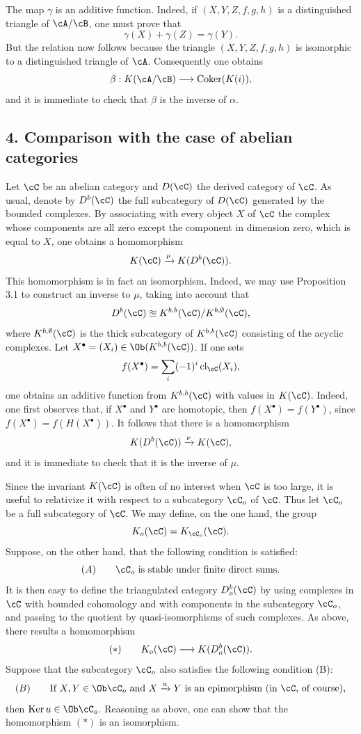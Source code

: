 The map $\gamma$ is an additive function. Indeed, if $(X,Y,Z,f,g,h)$ is a distinguished triangle of $\cA/\cB$, one must prove that
\[
\gamma(X)+\gamma(Z)=\gamma(Y).
\]
But the relation now follows because the triangle $(X,Y,Z,f,g,h)$ is isomorphic to a distinguished triangle of $\cA$. Consequently one obtains
\[
\beta:K(\cA/\cB)\longrightarrow \operatorname{Coker}(K(i)),
\]
and it is immediate to check that $\beta$ is the inverse of $\alpha$.

\subsection*{4. Comparison with the case of abelian categories}

Let $\cC$ be an abelian category and $D(\cC)$ the derived category of $\cC$. As usual, denote by $D^b(\cC)$ the full subcategory of $D(\cC)$ generated by the bounded complexes. By associating with every object $X$ of $\cC$ the complex whose components are all zero except the component in dimension zero, which is equal to $X$, one obtains a homomorphism
\[
K(\cC)\xrightarrow{\mu}K(D^b(\cC)).
\]
This homomorphism is in fact an isomorphism. Indeed, we may use Proposition 3.1 to construct an inverse to $\mu$, taking into account that
\[
D^b(\cC)\approxeq K^{b,b}(\cC)/K^{b,\emptyset}(\cC),
\]
where $K^{b,\emptyset}(\cC)$ is the thick subcategory of $K^{b,b}(\cC)$ consisting of the acyclic complexes. Let $X^\bullet=(X_i)\in\Ob(K^{b,b}(\cC))$. If one sets
\[
f(X^\bullet)=\sum_i(-1)^i\operatorname{cl}_{\cC}(X_i),
\]
one obtains an additive function from $K^{b,b}(\cC)$ with values in $K(\cC)$. Indeed, one first observes that, if $X^\bullet$ and $Y^\bullet$ are homotopic, then $f(X^\bullet)=f(Y^\bullet)$, since $f(X^\bullet)=f(H(X^\bullet))$. It follows that there is a homomorphism
\[
K(D^b(\cC))\xrightarrow{\nu}K(\cC),
\]
and it is immediate to check that it is the inverse of $\mu$.

Since the invariant $K(\cC)$ is often of no interest when $\cC$ is too large, it is useful to relativize it with respect to a subcategory $\cC_o$ of $\cC$. Thus let $\cC_o$ be a full subcategory of $\cC$. We may define, on the one hand, the group
\[
K_o(\cC)=K_{\cC_o}(\cC).
\]
Suppose, on the other hand, that the following condition is satisfied:
\[
(A)\qquad \cC_o\text{ is stable under finite direct sums.}
\]
It is then easy to define the triangulated category $D_o^b(\cC)$ by using complexes in $\cC$ with bounded cohomology and with components in the subcategory $\cC_o$, and passing to the quotient by quasi-isomorphisms of such complexes. As above, there results a homomorphism
\[
(*)\qquad K_o(\cC)\longrightarrow K(D_o^b(\cC)).
\]
Suppose that the subcategory $\cC_o$ also satisfies the following condition (B):
\[
(B)\qquad
\text{If }X,Y\in\Ob\cC_o\text{ and }X\xrightarrow{u}Y
\text{ is an epimorphism (in }\cC\text{, of course)},
\]
then $\operatorname{Ker}u\in\Ob\cC_o$. Reasoning as above, one can show that the homomorphism $(*)$ is an isomorphism.

